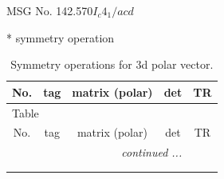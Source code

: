 \documentclass[fleqn,8pt]{jsarticle}
\begin{document}
\setcounter{MaxMatrixCols}{32}

\renewcommand{\tablename}{Table~}
\renewcommand{\figurename}{Figure~}
\begin{center}
\LARGE
MSG No. 142.570\quad$I_{c}4_{1}/acd$
\end{center}
* symmetry operation
\renewcommand{\arraystretch}{1.3}
\begin{longtable}{ccccc}
\caption{Symmetry operations for 3d polar vector.}
 \\
 \hline \hline
No. & tag & matrix (polar) & det & TR \\ \hline \endfirsthead

\multicolumn{4}{l}{\tablename\ \thetable{}} \\
 \hline \hline
No. & tag & matrix (polar) & det & TR \\ \hline \endhead

 \hline \hline
\multicolumn{4}{r}{\footnotesize\it continued ...} \\ \endfoot

 \hline \hline
\multicolumn{4}{r}{} \\ \endlastfoot


\end{longtable}
\end{document}
